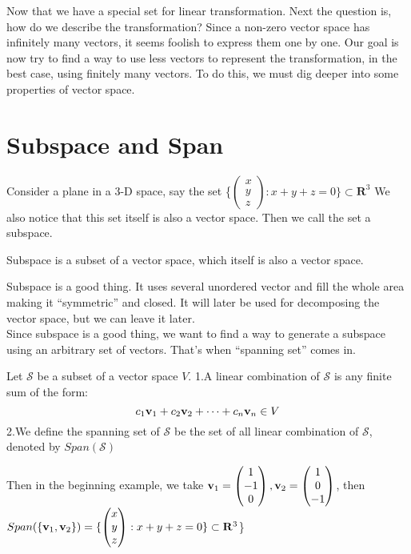 Now that we have a special set for linear transformation. Next the question is, how do we describe the transformation? Since a non-zero vector space has infinitely many vectors, it seems foolish to express them one by one. Our goal is now try to find a way to use less vectors to represent the transformation, in the best case, using finitely many vectors. To do this, we must dig deeper into some properties of vector space.

\section{Subspace and Span}
Consider a plane in a 3-D space, say the set \{$\begin{pmatrix}
        x\\
        y\\
        z
    \end{pmatrix}:x+y+z = 0\} \subset \mathbf{R}^3$
We also notice that this set itself is also a vector space. Then we call the set a subspace.
\begin{definition}
    Subspace is a subset of a vector space, which itself is also a vector space.
\end{definition}
Subspace is a good thing. It uses several unordered vector and fill the whole area making it ``symmetric'' and closed. It will later be used for decomposing the vector space, but we can leave it later.\\

Since subspace is a good thing, we want to find a way to generate a subspace using an arbitrary set of vectors. That's when ``spanning set'' comes in.

\begin{definition}
    Let $\mathcal{S}$ be a subset of a vector space $V$.
    1.A linear combination of $\mathcal{S}$ is any finite sum of the form:
    $$c_1\mathbf{v}_1+c_2\mathbf{v}_2+\cdots+c_n\mathbf{v}_n \in V$$
    2.We define the spanning set of $\mathcal{S}$ be the set of all linear combination of $\mathcal{S}$, denoted by $Span(\mathcal{{S}})$
\end{definition}

Then in the beginning example, we take $\mathbf{v}_1 = \begin{pmatrix}
    1\\
    -1\\
    0
\end{pmatrix}, \mathbf{v}_2 = \begin{pmatrix}
    1\\
    0\\
    -1
\end{pmatrix}$, then $Span(\{\mathbf{v}_1,\mathbf{v}_2\}) = \{\begin{pmatrix}
        x\\
        y\\
        z
    \end{pmatrix}:x+y+z = 0\} \subset \mathbf{R}^3$\}

